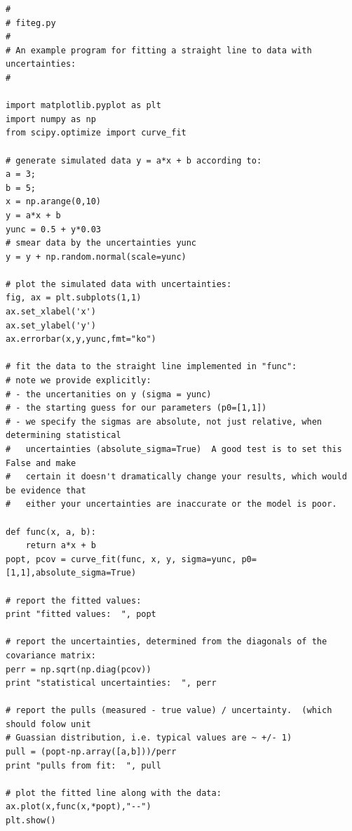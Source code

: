 \documentclass[12pt]{article}
\begin{document}
\begin{verbatim}
#
# fiteg.py
#
# An example program for fitting a straight line to data with uncertainties:
# 

import matplotlib.pyplot as plt
import numpy as np
from scipy.optimize import curve_fit

# generate simulated data y = a*x + b according to:
a = 3;
b = 5;
x = np.arange(0,10)
y = a*x + b
yunc = 0.5 + y*0.03
# smear data by the uncertainties yunc
y = y + np.random.normal(scale=yunc)

# plot the simulated data with uncertainties:
fig, ax = plt.subplots(1,1)
ax.set_xlabel('x')
ax.set_ylabel('y')
ax.errorbar(x,y,yunc,fmt="ko")

# fit the data to the straight line implemented in "func":
# note we provide explicitly:
# - the uncertanities on y (sigma = yunc)
# - the starting guess for our parameters (p0=[1,1])
# - we specify the sigmas are absolute, not just relative, when determining statistical 
#   uncertainties (absolute_sigma=True)  A good test is to set this False and make 
#   certain it doesn't dramatically change your results, which would be evidence that 
#   either your uncertainties are inaccurate or the model is poor.

def func(x, a, b):
    return a*x + b
popt, pcov = curve_fit(func, x, y, sigma=yunc, p0=[1,1],absolute_sigma=True)

# report the fitted values:
print "fitted values:  ", popt

# report the uncertainties, determined from the diagonals of the covariance matrix:
perr = np.sqrt(np.diag(pcov))
print "statistical uncertainties:  ", perr

# report the pulls (measured - true value) / uncertainty.  (which should folow unit 
# Guassian distribution, i.e. typical values are ~ +/- 1)
pull = (popt-np.array([a,b]))/perr
print "pulls from fit:  ", pull

# plot the fitted line along with the data:
ax.plot(x,func(x,*popt),"--")
plt.show()
\end{verbatim}




\end{document}
